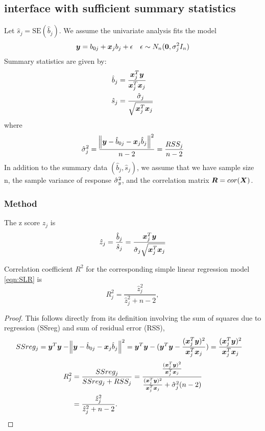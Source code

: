 \subsection{\susie interface with sufficient summary statistics}
Let $\hat{s}_j = \text{SE}(\hat{b}_j)$. We assume the univariate analysis fits the model
\begin{equation}\label{eqn:SLR}
    \bm y = b_{0j} + \bm x_j b_j + \epsilon \quad \epsilon\sim N_n(\bm{0}, \sigma_j^2 I_n)
\end{equation}
Summary statistics are given by:
\begin{align}
    \hat{b}_{j} &= \frac{\bm x_{j}^{T}\bm y}{\bm x_{j}^{T}\bm x_{j}} \\
    \hat{s}_{j} &= \frac{\hat{\sigma}_{j}}{\sqrt{\bm x_{j}^{T}\bm x_{j}}} \label{eqn:shat}
\end{align}
where
\begin{equation}
    \hat{\sigma}_{j}^{2} = \frac{\norm{\bm y - \hat{b}_{0j} - \bm x_{j} \hat{b}_{j}}^2}{n-2} = \frac{RSS_{j}}{n-2}
\end{equation}
In addition to the summary data $(\hat{b}_j, \hat{s}_j)$, we assume that we have sample size n, the sample variance of response $\hat{\sigma}_y^2$, and the correlation matrix $\bm R = cor(\bm X)$.

\subsubsection{Method}

The z score $\hat{z}_j$ is
\begin{equation}
     \hat{z}_{j} = \frac{\hat{b}_{j}}{\hat{s}_{j}} = \frac{\bm x_{j}^{T}\bm y}{\hat{\sigma}_{j}\sqrt{\bm x_{j}^{T}\bm x_{j}}}
\end{equation}
\begin{proposition} \label{prop:Cor Coeff}
Correlation coefficient $R^2$ for the corresponding simple linear regression model \eqref{eqn:SLR} is
\begin{equation}
    R_{j}^2 = \frac{\hat{z}_{j}^2}{\hat{z}_{j}^2+n-2},
\end{equation}
\end{proposition}

\begin{proof}
This follows directly from its definition involving the sum of squares due to regression (SSreg) and sum of residual error (RSS),
\begin{align}
    SSreg_j &= \bm y^T \bm y - \norm{\bm y - \hat{b}_{0j} - \bm x_{j} \hat{b}_{j}}^2 = \bm y^T \bm y - (\bm y^T \bm y - \frac{(\bm x_{j}^{T}\bm y)^2}{\bm x_{j}^{T}\bm x_{j}}) = \frac{(\bm x_{j}^{T}\bm y)^2}{\bm x_{j}^{T}\bm x_{j}}
\end{align}
\begin{align}
    R_{j}^2 &= \frac{SSreg_j}{SSreg_j + RSS_j} = \frac{\frac{(\bm x_{j}^{T}\bm y)^2}{\bm x_{j}^{T}\bm x_{j}}}{\frac{(\bm x_{j}^{T}\bm y)^2}{\bm x_{j}^{T}\bm x_{j}} + \hat{\sigma}_{j}^{2}(n-2)} \\
    &= \frac{\hat{z}_{j}^2}{\hat{z}_{j}^2+n-2}.
\end{align}
\end{proof}

